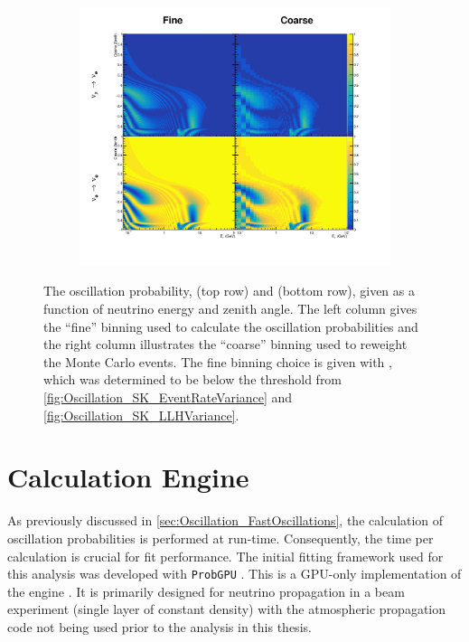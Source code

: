 \begin{figure}[h]
  \begin{subfigure}[t]{\textwidth}
    \includegraphics[width=\textwidth, trim={0mm 0mm 0mm 0mm}, clip,page=1]{Figures/Oscillation/SmearingImplementation.pdf}
  \end{subfigure}
  \caption{The oscillation probability,  (top row) and  (bottom row), given as a function of neutrino energy and zenith angle. The left column gives the ``fine'' binning used to calculate the oscillation probabilities and the right column illustrates the ``coarse'' binning used to reweight the Monte Carlo events. The fine binning choice is given with , which was determined to be below the threshold from \autoref{fig:Oscillation_SK_EventRateVariance} and \autoref{fig:Oscillation_SK_LLHVariance}.}
  \label{fig:Oscillation_SK_SmearingImplementation}
\end{figure}

\section{Calculation Engine}
\label{sec:Oscillation_CalculationEngine}

As previously discussed in \autoref{sec:Oscillation_FastOscillations}, the calculation of oscillation probabilities is performed at run-time. Consequently, the time per calculation is crucial for fit performance. The initial fitting framework used for this analysis was developed with \texttt{ProbGPU} \cite{probgpu}. This is a GPU-only implementation of the  engine \cite{Prob3}. It is primarily designed for neutrino propagation in a beam experiment (single layer of constant density) with the atmospheric propagation code not being used prior to the analysis in this thesis.

